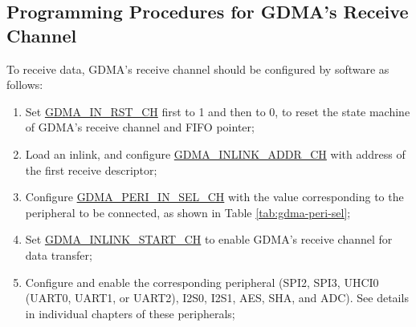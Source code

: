 \documentclass[main\_\_EN.tex]{subfiles}
\begin{document}
\subsection{Programming Procedures for GDMA's Receive Channel}
To receive data, GDMA's receive channel should be configured by software as follows:
\begin{enumerate}
    \item Set \hyperref[fielddesc:DMAINRSTCHN]{GDMA\_IN\_RST\_CH} first to 1 and then to 0, to reset the state machine of GDMA's receive channel and FIFO pointer;
    \item Load an inlink, and configure \hyperref[fielddesc:DMAINLINKADDRCHN]{GDMA\_INLINK\_ADDR\_CH} with address of the first receive descriptor;
    \item Configure \hyperref[fielddesc:DMAPERIINSELCHN]{GDMA\_PERI\_IN\_SEL\_CH} with the value corresponding to the peripheral to be connected, as shown in Table \ref{tab:gdma-peri-sel};
    \item Set \hyperref[fielddesc:DMAINLINKSTARTCHN]{GDMA\_INLINK\_START\_CH} to enable GDMA's receive channel for data transfer;
    \item Configure and enable the corresponding peripheral (SPI2, SPI3, UHCI0 (UART0, UART1, or UART2), I2S0, I2S1, AES, SHA, and ADC). See details in individual chapters of these peripherals;
\end{enumerate}
\end{document}

